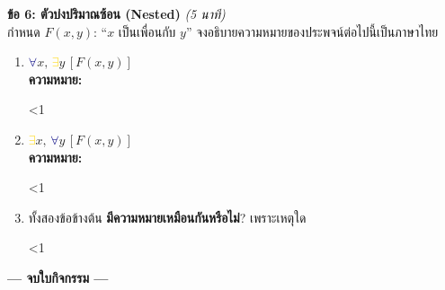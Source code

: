 \documentclass[a4paper,12pt]{article}
\newcounter{bl}
\newcommand{\blank}[1]{\par\vspace{0.2em}%
  \setcounter{bl}{0}\loop\ifnum\value{bl}<#1\relax
  \noindent\textcolor{gray!60}{\hrulefill}\par\vspace{1.0em}\stepcounter{bl}\repeat}
\newcommand{\A}{\textcolor{navy}{$\forall$}}
\newcommand{\E}{\textcolor{gold}{$\exists$}}
\begin{document}
\noindent\textbf{ข้อ 6: ตัวบ่งปริมาณซ้อน (Nested)} \hfill \textit{(5 นาที)} \\
กำหนด $F(x,y)$: ``$x$ เป็นเพื่อนกับ $y$'' จงอธิบายความหมายของประพจน์ต่อไปนี้เป็นภาษาไทย
\begin{enumerate}[label=\arabic*)]
  \item \A$x,\,$\E$y\,[F(x,y)]$\\
        \textbf{ความหมาย:} \blank{1}
  \item \E$x,\,$\A$y\,[F(x,y)]$\\
        \textbf{ความหมาย:} \blank{1}
  \item ทั้งสองข้อข้างต้น \textbf{มีความหมายเหมือนกันหรือไม่}? เพราะเหตุใด\\
        \blank{1}
\end{enumerate}

\vspace{0.5em}
\begin{center}
  \color{navy}\textbf{--- จบใบกิจกรรม ---}
\end{center}
\end{document}
